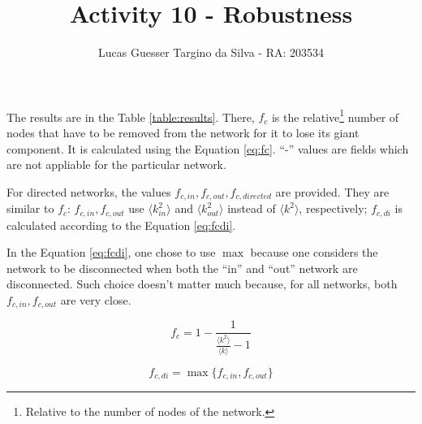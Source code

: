 \documentclass{article}
\title{Activity 10 - Robustness}
\author{Lucas Guesser Targino da Silva - RA: 203534}
\begin{document}
\maketitle

The results are in the Table \ref{table:results}. There, $f_c$ is the relative\footnote{Relative to the number of nodes of the network.} number of nodes that have to be removed from the network for it to lose its giant component. It is calculated using the Equation \ref{eq:fc}. ``-'' values are fields which are not appliable for the particular network.

For directed networks, the values $f_{c, in}, f_{c, out}, f_{c, directed}$ are provided. They are similar to $f_c$: $f_{c, in}, f_{c, out}$ use $\langle k_{in}^2 \rangle$ and $\langle k_{out}^2 \rangle$ instead of $\langle k^2 \rangle$, respectively; $f_{c, di}$ is calculated according to the Equation \ref{eq:fcdi}.

In the Equation \ref{eq:fcdi}, one chose to use $\max$ because one considers the network to be disconnected when both the ``in'' and ``out'' network are disconnected. Such choice doesn't matter much because, for all networks, both $f_{c, in}, f_{c, out}$ are very close.

\begin{equation}
    \label{eq:fc}
    f_c = 1 - \dfrac{1}{\frac{\langle k^2 \rangle}{\langle k \rangle} - 1}
\end{equation}

\begin{equation}
    \label{eq:fcdi}
    f_{c, di} = \max \{f_{c, in}, f_{c, out}\}
\end{equation}


\end{document}
